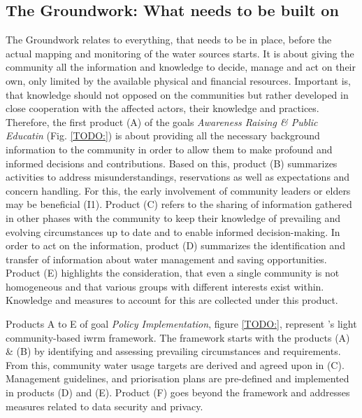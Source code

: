 
\subsection{The Groundwork: What needs to be built on}\label{subsubsec:groundwork}
The Groundwork relates to everything, that needs to be in place, before the actual mapping and monitoring of the water sources starts. It is about giving the community all the information and knowledge to decide, manage and act on their own, only limited by the available physical and financial resources. Important is, that knowledge should not opposed on the communities but rather developed in close cooperation with the affected actors, their knowledge and practices. Therefore, the first product (A) of the goals \textit{Awareness Raising \& Public Educatin} (Fig. \ref*{TODO:}) is about providing all the necessary background information to the community in order to allow them to make profound and informed decisions and contributions. Based on this, product (B) summarizes activities to address misunderstandings, reservations as well as expectations and concern handling. For this, the early involvement of community leaders or elders may be beneficial (I1). Product (C) refers to the sharing of information gathered in other phases with the community to keep their knowledge of prevailing and evolving circumstances up to date and to enable informed decision-making. In order to act on the information, product (D) summarizes the identification and transfer of information about water management and saving opportunities. Product (E) highlights the consideration, that even a single community is not homogeneous and that various groups with different interests exist within. Knowledge and measures to account for this are collected under this product.\newline


Products A to E of goal \textit{Policy Implementation}, figure \ref*{TODO:}, represent \autocite{dayCommunitybasedWaterResources2009}'s light community-based \acrshort{iwrm} framework. The framework starts with the products (A) \& (B) by identifying and assessing prevailing circumstances and requirements. From this, community water usage targets are derived and agreed upon in (C). Management guidelines, and priorisation plans are pre-defined and implemented in products (D) and (E). Product (F) goes beyond the framework and addresses measures related to data security and privacy.

